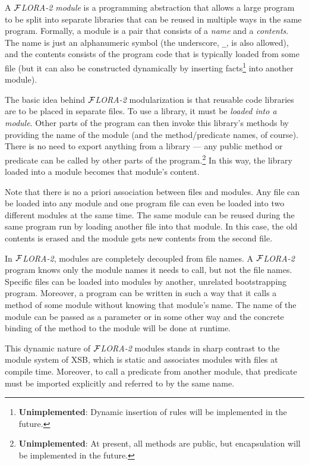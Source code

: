 \documentclass[11pt]{article}
\newcommand{\FLORA}{{\mbox{${\cal F}${\small\it LORA}\rm\emph{-2}}}\xspace}
\begin{document}
A \emph{\FLORA module} is a programming abstraction that allows a large
program to be split into separate libraries that can be reused in multiple
ways in the same program. Formally, a module is a pair that consists of a
\emph{name} and a \emph{contents}. The name is just an alphanumeric symbol
(the underscore, {\tt \_}, is also allowed), and the contents consists of
the program code that is typically loaded from some file (but it can also
be constructed dynamically by inserting facts\footnote{
  {\bf Unimplemented}: Dynamic insertion of rules will be implemented in
  the future.
  }
into another module).

The basic idea behind \FLORA modularization is that reusable code libraries
are to be placed in separate files.  To use a library, it must be
\emph{loaded into a module}. Other parts of the program can then invoke
this library's methods by providing the name of the module (and the
method/predicate names, of course).  There is no need to export anything
from a library --- any public method or predicate can be called by other
parts of the program.\footnote{
  {\bf Unimplemented}: At present, all methods are public, but
  encapsulation will be implemented in the future.
  }
In this way, the library loaded into a module becomes that module's content.

Note that there is no a priori association between files and modules.  Any
file can be loaded into any module and one program file can even be loaded
into two different modules at the same time. The same module can be reused
during the same program run by loading another file into that module. In
this case, the old contents is erased and the module gets new contents from
the second file.

In \FLORA, modules are completely decoupled from file names. A \FLORA
program knows only the module names it needs to call, but not the file
names. Specific files can be loaded into modules by another, unrelated
bootstrapping program. Moreover, a program can be written in such a way
that it calls a method of some module without knowing that module's name.
The name of the module can be passed as a parameter or in some other way
and the concrete binding of the method to the module will be done at
runtime.

This dynamic nature of \FLORA modules stands in sharp contrast to the module
system of XSB, which is static and associates modules with files at compile
time. Moreover, to call a predicate from another module, that predicate
must be imported explicitly and referred to by the same name.
\end{document}
